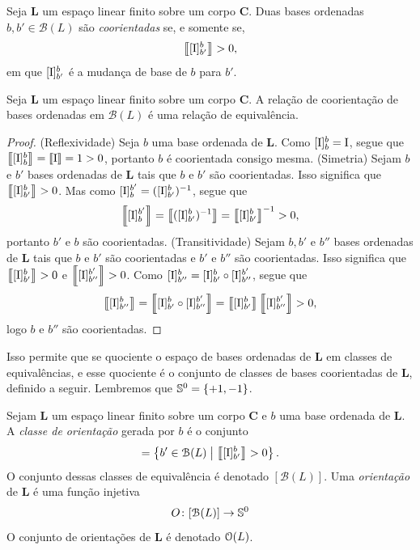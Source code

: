 \begin{definition}
Seja $\bm L$ um espaço linear finito sobre um corpo $\bm C$. Duas bases ordenadas $b, b' \in \mathcal{B}(L)$ são \emph{coorientadas} se, e somente se,
	\begin{equation*}
	\det{[\Id]^b_{b'}} > 0,
	\end{equation*}
em que $[\Id]_{b'}^b$ é a mudança de base de $b$ para $b'$.
\end{definition}

\begin{proposition}
Seja $\bm L$ um espaço linear finito sobre um corpo $\bm C$. A relação de coorientação de bases ordenadas em $\mathcal{B}(L)$ é uma relação de equivalência.
\end{proposition}
\begin{proof}
(Reflexividade) Seja $b$ uma base ordenada de $\bm L$. Como $[\Id]^b_b = \Id$, segue que $\det{[\Id]^b_b} = \det{\Id} = 1 >0$, portanto $b$ é coorientada consigo mesma.
(Simetria) Sejam $b$ e $b'$ bases ordenadas de $\bm L$ tais que $b$ e $b'$ são coorientadas. Isso significa que $\det{[\Id]^b_{b'}} >0$. Mas como $[\Id]_b^{b'} = ([\Id]^b_{b'})\inv$, segue que
	\begin{equation*}
	\det{[\Id]_b^{b'}} = \det{([\Id]^b_{b'})\inv} = \det{[\Id]^b_{b'}}\inv > 0,
	\end{equation*}
portanto $b'$ e $b$ são coorientadas.
(Transitividade) Sejam $b,b'$ e $b''$ bases ordenadas de $\bm L$ tais que $b$ e $b'$ são coorientadas e $b'$ e $b''$ são coorientadas. Isso significa que $\det{[\Id]^b_{b'}} > 0$ e $\det{[\Id]^{b'}_{b''}} > 0$. Como $[\Id]^b_{b''} = [\Id]^b_{b'} \circ [\Id]^{b'}_{b''}$, segue que
	\begin{equation*}
	\det{[\Id]^b_{b''}} = \det{[\Id]^b_{b'} \circ [\Id]^{b'}_{b''}} = \det{[\Id]^b_{b'}} \det{[\Id]^{b'}_{b''}} > 0,
	\end{equation*}
logo $b$ e $b''$ são coorientadas.
\end{proof}

Isso permite que se quociente o espaço de bases ordenadas de $\bm L$ em classes de equivalências, e esse quociente é o conjunto de classes de bases coorientadas de $\bm L$, definido a seguir. Lembremos que $\S^0 = \{+1,-1\}$.

\begin{definition}
Sejam $\bm L$ um espaço linear finito sobre um corpo $\bm C$ e $b$ uma base ordenada de $\bm L$. A \emph{classe de orientação} gerada por $b$ é o conjunto
	\begin{equation*}
	[b] = \set{b' \in \mathcal{B}(L)}{\det{[\Id]^b_{b'}} > 0}.
	\end{equation*}
O conjunto dessas classes de equivalência é denotado $[\mathcal{B}(L)]$. Uma \emph{orientação} de $\bm L$ é uma função injetiva
	\begin{equation*}
	O\colon [\mathcal{B}(L)] \to \S^0
	\end{equation*}
O conjunto de orientações de $\bm L$ é denotado $\orient(L)$.
\end{definition}

